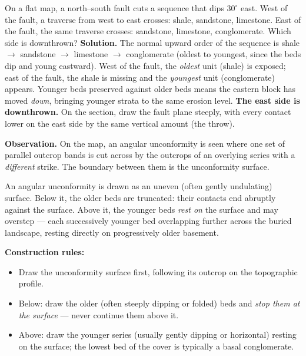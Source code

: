 \documentclass[11pt]{article}
\newcommand{\cle}[1]{{\popxbold\color{popdark}#1}}
\newcounter{popsec}
\newcounter{popsub}
\newcommand{\courssub}[1]{%
  \stepcounter{popsub}%
  \par\vspace{9pt}\noindent{\popxbold\fontsize{11.5}{13}\selectfont\color{popink}{\color{poporange}\thepopsec.\thepopsub}\hspace{6pt}#1}\par\nopagebreak\vspace{4pt}
}
\begin{document}
\begin{exoresolu}
On a flat map, a north--south fault cuts a sequence that dips $30^{\circ}$ east. West of the fault, a traverse from west to east crosses: shale, sandstone, limestone. East of the fault, the same traverse crosses: sandstone, limestone, conglomerate. Which side is downthrown?
\tcblower
\textbf{Solution.} The normal upward order of the sequence is shale $\rightarrow$ sandstone $\rightarrow$ limestone $\rightarrow$ conglomerate (oldest to youngest, since the beds dip and young eastward). West of the fault, the \emph{oldest} unit (shale) is exposed; east of the fault, the shale is missing and the \emph{youngest} unit (conglomerate) appears. Younger beds preserved against older beds means the eastern block has moved \emph{down}, bringing younger strata to the same erosion level. \textbf{The east side is downthrown.} On the section, draw the fault plane steeply, with every contact lower on the east side by the same vertical amount (the throw).
\end{exoresolu}

\courssub{Unconformities on Section}

\textbf{Observation.} On the map, an \cle{angular unconformity} is seen where one set of parallel outcrop bands is cut across by the outcrops of an overlying series with a \emph{different} strike. The boundary between them is the unconformity surface.

\begin{definition}
An angular unconformity is drawn as an uneven (often gently undulating) surface. Below it, the older beds are \cle{truncated}: their contacts end abruptly against the surface. Above it, the younger beds \emph{rest on} the surface and may \cle{overstep} — each successively younger bed overlapping further across the buried landscape, resting directly on progressively older basement.
\end{definition}

\textbf{Construction rules:}
\begin{itemize}
\item Draw the unconformity surface first, following its outcrop on the topographic profile.
\item Below: draw the older (often steeply dipping or folded) beds and \emph{stop them at the surface} — never continue them above it.
\item Above: draw the younger series (usually gently dipping or horizontal) resting on the surface; the lowest bed of the cover is typically a \cle{basal conglomerate}.
\end{itemize}
\end{document}
